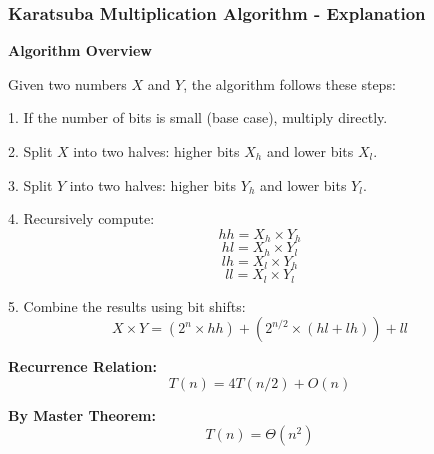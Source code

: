 \begin{frame}
    \frametitle{Karatsuba Multiplication Algorithm - Explanation}

    \textbf{Algorithm Overview}  

    Given two numbers \( X \) and \( Y \), the algorithm follows these steps:

    1. If the number of bits is small (base case), multiply directly.
    
    2. Split \( X \) into two halves: higher bits \( X_h \) and lower bits \( X_l \).
    
    3. Split \( Y \) into two halves: higher bits \( Y_h \) and lower bits \( Y_l \).
    
    4. Recursively compute:
       \[
       hh = X_h \times Y_h
       \]
       \[
       hl = X_h \times Y_l
       \]
       \[
       lh = X_l \times Y_h
       \]
       \[
       ll = X_l \times Y_l
       \]

    5. Combine the results using bit shifts:
       \[
       X \times Y = (2^n \times hh) + (2^{n/2} \times (hl + lh)) + ll
       \]

    \textbf{Recurrence Relation:}
    \begin{equation*}
        T(n) = 4T(n/2) + O(n)
    \end{equation*}

    \textbf{By Master Theorem:}
    \begin{equation*}
        T(n) = \Theta(n^2)
    \end{equation*}

\end{frame}



